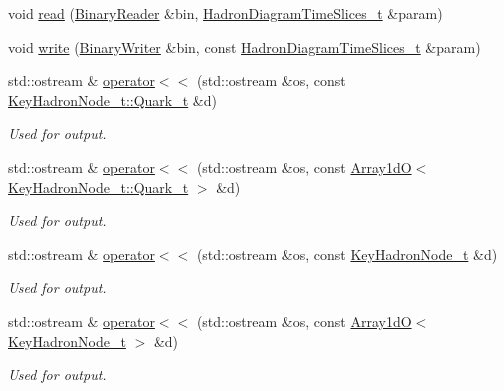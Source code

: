\begin{DoxyCompactItemize}
void \mbox{\hyperlink{namespaceHadron_a638347ea091d8f1823241f5551abb96e}{read}} (\mbox{\hyperlink{classADATIO_1_1BinaryReader}{Binary\+Reader}} \&bin, \mbox{\hyperlink{structHadron_1_1HadronDiagramTimeSlices__t}{Hadron\+Diagram\+Time\+Slices\+\_\+t}} \&param)
\item 
void \mbox{\hyperlink{namespaceHadron_a70fe8dc6184653dde216306a0f4681d9}{write}} (\mbox{\hyperlink{classADATIO_1_1BinaryWriter}{Binary\+Writer}} \&bin, const \mbox{\hyperlink{structHadron_1_1HadronDiagramTimeSlices__t}{Hadron\+Diagram\+Time\+Slices\+\_\+t}} \&param)
\item 
std\+::ostream \& \mbox{\hyperlink{namespaceHadron_a0c52fe94d4afb343c44206908152316e}{operator$<$$<$}} (std\+::ostream \&os, const \mbox{\hyperlink{structHadron_1_1KeyHadronNode__t_1_1Quark__t}{Key\+Hadron\+Node\+\_\+t\+::\+Quark\+\_\+t}} \&d)
\begin{DoxyCompactList}\small\item\em Used for output. \end{DoxyCompactList}\item 
std\+::ostream \& \mbox{\hyperlink{namespaceHadron_a0bf650d748bab6ca6ae6a8d49dd44124}{operator$<$$<$}} (std\+::ostream \&os, const \mbox{\hyperlink{classADAT_1_1Array1dO}{Array1dO}}$<$ \mbox{\hyperlink{structHadron_1_1KeyHadronNode__t_1_1Quark__t}{Key\+Hadron\+Node\+\_\+t\+::\+Quark\+\_\+t}} $>$ \&d)
\begin{DoxyCompactList}\small\item\em Used for output. \end{DoxyCompactList}\item 
std\+::ostream \& \mbox{\hyperlink{namespaceHadron_accc8a0a89713671c3a48ac45536eac45}{operator$<$$<$}} (std\+::ostream \&os, const \mbox{\hyperlink{structHadron_1_1KeyHadronNode__t}{Key\+Hadron\+Node\+\_\+t}} \&d)
\begin{DoxyCompactList}\small\item\em Used for output. \end{DoxyCompactList}\item 
std\+::ostream \& \mbox{\hyperlink{namespaceHadron_a243db37c66ec71b086f54a64d62fa659}{operator$<$$<$}} (std\+::ostream \&os, const \mbox{\hyperlink{classADAT_1_1Array1dO}{Array1dO}}$<$ \mbox{\hyperlink{structHadron_1_1KeyHadronNode__t}{Key\+Hadron\+Node\+\_\+t}} $>$ \&d)
\begin{DoxyCompactList}\small\item\em Used for output. \end{DoxyCompactList}\item 

\end{DoxyCompactItemize}

